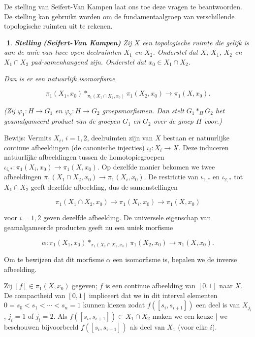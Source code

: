 \documentclass[12pt]{book}
\newcommand{\bew}{{\sc Bewijs: }}
\newtheorem{stelh}{$\!\!$}[section]
\newenvironment{stel}{\begin{stelh}{\em {\bf Stelling }}}{\end{stelh}}
\begin{document}
De stelling van Seifert-Van Kampen laat ons toe deze vragen te beantwoorden. De stelling kan gebruikt worden om de fundamentaalgroep van verschillende topologische ruimten uit te rekenen. 

\begin{stel}{\textbf{\em(Seifert-Van Kampen)}} \label{SVK}
Zij $X$ een topologische ruimte die gelijk is aan de unie van twee open deelruimten $X_1$ en $X_2$.
Onderstel dat $X$, $X_1$, $X_2$ en $X_1\cap X_2$ pad-samenhangend zijn.
Onderstel dat $x_0\in X_1\cap X_2$.

Dan is er een natuurlijk isomorfisme

$$\pi_{1}(X_1, x_0)\ast_{\pi_{1}(X_1\cap X_2, x_0)}\pi_{1}(X_2, x_0)\to \pi_{1}(X, x_0).$$

(Zij $\varphi_1: H\to G_1$ en $\varphi_2: H\to G_2$ groepsmorfismen. Dan stelt  $G_1 \ast_H G_2$ het geamalgameerd product van de groepen $G_1$ en $G_2$ over de groep $H$ voor.)
\end{stel}

\bew
Vermits $X_i$, $i=1,2$, deelruimten zijn van
$X$ bestaan er natuurlijke continue afbeeldingen (de cano\-ni\-sche injecties) $\iota_{i}:X_i\to X$.
Deze induceren natuurlijke afbeeldingen tussen de homotopiegroepen $\iota_{i,*}:\pi_{1}(X_i,x_0)\to
\pi_{1}(X,x_0)$. Op dezelfde manier bekomen we twee afbeeldingen $\pi_{1}(X_1\cap X_2, x_0)\to
\pi_{1}(X_i,x_0)$. De restrictie van $\iota_{1,*}$ en $\iota_{2,*}$ tot $X_1\cap X_2$ geeft dezelfde
afbeelding, dus de samenstellingen

$$\pi_{1}(X_1\cap X_2, x_0) \to \pi_{1}(X_i,x_0)\to \pi_{1}(X,x_0)$$

voor $i=1,2$ geven dezelfde afbeelding. De universele eigenschap van geamalgameerde producten geeft nu een uniek morfisme

$$\alpha:\pi_{1}(X_1, x_0)\ast_{\pi_{1}(X_1\cap X_2, x_0)}\pi_{1}(X_2, x_0)\to \pi_{1}(X, x_0).$$


Om te bewijzen dat dit morfisme $\alpha$ een isomorfisme is, bepalen we de inverse afbeelding.

Zij $[f]\in \pi_{1}(X,x_0)$ gegeven; $f$ is een continue afbeelding van $[0,1]$ naar $X$. De
compactheid van $[0,1]$ impliceert dat  
we in dit interval elementen $0=s_0< s_1 < \cdots <s_n=1$ kunnen kiezen zodat
$f([s_i,s_{i+1}])$ een deel is van $X_{j_{i}}$, $j_{i}=1$ of $j_{i}=2$.
Als $f([s_i, s_{i+1}])\subset X_1\cap X_2$  maken we een keuze | we beschouwen
bijvoorbeeld $f([s_i, s_{i+1}])$ als deel van $X_1$ (voor elke $i$).
\end{document}
